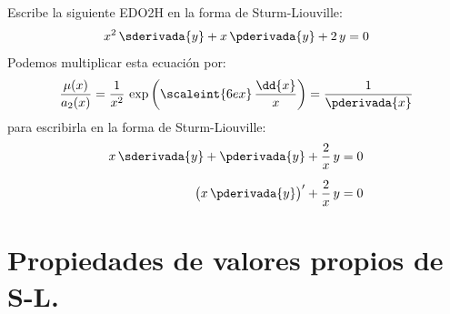 \begin{ejemplo}\label{Ejemplo_01}
Escribe la siguiente EDO2H en la forma de Sturm-Liouville:
\begin{align*}
x^{2} \, \sderivada{y} + x \, \pderivada{y} + 2 \, y = 0
\end{align*}
Podemos multiplicar esta ecuación por:
\begin{align*}
\dfrac{\mu (x)}{a_{2}(x)} = \dfrac{1}{x^{2}} \, \exp \left( \scaleint{6ex} \, \dfrac{\dd{x}}{x} \right) = \dfrac{1}{\pderivada{x}}
\end{align*}
para escribirla en la forma de Sturm-Liouville:
\begin{align*}
x \, \sderivada{y} + \pderivada{y} + \dfrac{2}{x} \, y &= 0 \\[0.5em]
\big( x \, \pderivada{y} \big)^{\prime} +  \dfrac{2}{x} \, y &= 0
\end{align*}
\end{ejemplo}

\section{Propiedades de valores propios de S-L.}

